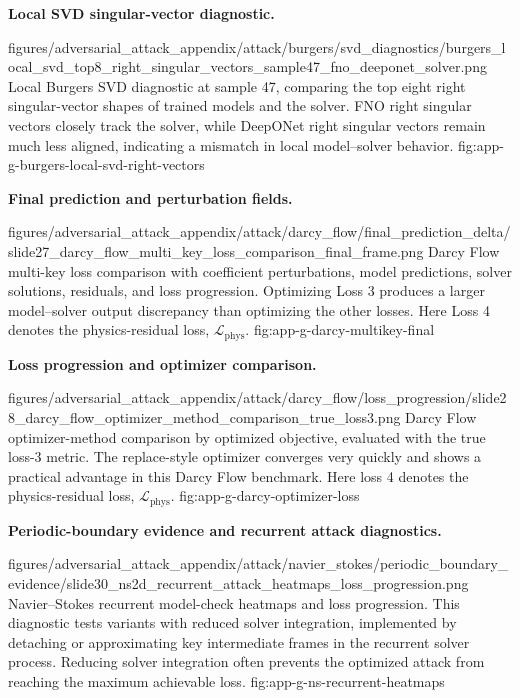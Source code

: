 \documentclass[letterpaper]{article} %
\newcounter{appendixsection}
\newcounter{appendixsubsection}[appendixsection]
\newcounter{appendixdomain}[appendixsubsection]
\begin{document}
\noindent\textbf{Local SVD singular-vector diagnostic.}

\appendixattackfig
  {figures/adversarial_attack_appendix/attack/burgers/svd_diagnostics/burgers_local_svd_top8_right_singular_vectors_sample47_fno_deeponet_solver.png}
  {Local Burgers SVD diagnostic at sample 47, comparing the top eight right
  singular-vector shapes of trained models and the solver. FNO right singular
  vectors closely track the solver, while DeepONet right singular vectors remain
  much less aligned, indicating a mismatch in local model--solver behavior.}
  {fig:app-g-burgers-local-svd-right-vectors}

\FloatBarrier
{}

\noindent\textbf{Final prediction and perturbation fields.}

\appendixattackfig
  {figures/adversarial_attack_appendix/attack/darcy_flow/final_prediction_delta/slide27_darcy_flow_multi_key_loss_comparison_final_frame.png}
  {Darcy Flow multi-key loss comparison with coefficient perturbations, model
  predictions, solver solutions, residuals, and loss progression. Optimizing
  Loss 3 produces a larger model--solver output discrepancy than optimizing the
  other losses. Here Loss 4 denotes the physics-residual loss,
  $\mathcal{L}_{\mathrm{phys}}$.}
  {fig:app-g-darcy-multikey-final}

\clearpage
\noindent\textbf{Loss progression and optimizer comparison.}

\appendixattackfigstacked
  {figures/adversarial_attack_appendix/attack/darcy_flow/loss_progression/slide28_darcy_flow_optimizer_method_comparison_true_loss3.png}
  {Darcy Flow optimizer-method comparison by optimized objective, evaluated
  with the true loss-3 metric. The replace-style optimizer converges very
  quickly and shows a practical advantage in this Darcy Flow benchmark. Here
  loss 4 denotes the physics-residual loss, $\mathcal{L}_{\mathrm{phys}}$.}
  {fig:app-g-darcy-optimizer-loss}

\FloatBarrier
{}

\noindent\textbf{Periodic-boundary evidence and recurrent attack diagnostics.}

\appendixattackfigstacked
  {figures/adversarial_attack_appendix/attack/navier_stokes/periodic_boundary_evidence/slide30_ns2d_recurrent_attack_heatmaps_loss_progression.png}
  {Navier--Stokes recurrent model-check heatmaps and loss progression. This
  diagnostic tests variants with reduced solver integration, implemented by
  detaching or approximating key intermediate frames in the recurrent solver
  process. Reducing solver integration often prevents the optimized attack from
  reaching the maximum achievable loss.}
  {fig:app-g-ns-recurrent-heatmaps}
\end{document}
